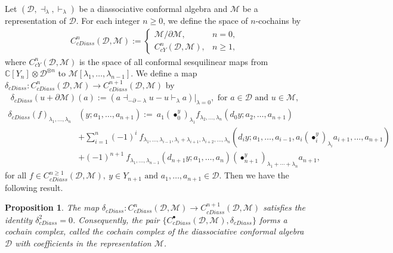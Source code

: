 \documentclass[a4paper,reqno,10pt]{amsart}
\theoremstyle{plain}
\newtheorem{proposition}[thm]{Proposition}
\theoremstyle{definition}
\theoremstyle{remark}
\newcommand{\C}{\mathbb{C}}
\newcommand{\D}{\mathcal{D}}
\newcommand{\M}{\mathcal{M}}
\newcommand{\p}{\partial}
\newcommand{\la}{\lambda}
\begin{document}
\medskip

Let $(\D, \dashv_{\la}, \vdash_{\la})$ be a diassociative conformal algebra and $\M$ be a representation of $\D$. For each integer $n \geq 0$, we define the space of $n$-cochains by
\begin{align*}
    C_{cDiass}^{n}(\D,\M) := 
    \begin{cases}
       \M/{\p \M},   &  n =0,\\
        C_{cY}^{n}(\D,\M),  & n \geq 1,
    \end{cases}
\end{align*}
where $C_{cY}^{n}(\D,\M)$ is the space of all conformal sesquilinear maps from $\mathbb{C}[Y_n]\otimes \D^{\otimes n}$ to $\M[\la_{1}, \dots ,\la_{n-1}]$. 
We define a map $\delta_{cDiass} : C_{cDiass}^{n}(\D,\M) \to  C_{cDiass}^{n+1}(\D,\M)$ by
\begin{align}\label{coboundary-m1}
    \delta_{cDiass}(u+\p\M)(a) := \left(a\dashv_{-\p-\la}u-u\vdash_{\la}a\right) \big|_{\la=0}, \text{ for } a \in \D \text{ and } u \in \M,
\end{align}
\begin{align}\label{coboundary-m2}
   {\delta_{cDiass}(f)}_{\la_1, \ldots, \la_n}&(y;a_1, \ldots , a_{n+1}) :=~  
a_{1} (\bullet_{0}^{y})_{ \la_{1}}f_{ \la_{2}, \ldots, \la_{n}}(d_{0}y; a_{2}, \ldots , a_{n+1}) \nonumber \\&+ \sum_{i =1}^{n}(-1)^{i} ~ \! f_{ \la_{1}, \ldots , \la_{i-1}, \la_{i}+ \la_{i+1}, \la_{i+2}, \ldots , \la_{n}}(d_{i}y; a_{1}, \ldots, a_{i-1},a_{i}(\bullet_{i}^{y})_{\la_{i}} a_{i+1}, \ldots, a_{n+1}) \nonumber \\&
+(-1)^{n+1} ~ \! f_{\la_{1}, \ldots, \la_{n-1}}(d_{n+1}y; a_{1}, \ldots, a_{n})(\bullet_{n+1}^{y})_{\la_{1}+ \cdots+ \la_{n} }a_{n+1},
\end{align}
for all $f \in C_{cDiass}^{n \geq 1}(\D,\M), ~ y \in Y_{n+1} \text{ and } a_1, \ldots , a_{n+1} \in \D$. Then we have the following result.
\begin{proposition}
   The map $\delta_{cDiass} : C_{cDiass}^{n}(\D,\M) \to  C_{cDiass}^{n+1}(\D,\M)$ satisfies the identity $\delta_{cDiass}^{2} = 0$. Consequently, the pair $\{C_{cDiass}^{\bullet}(\D,\M), \delta_{cDiass}\}$ forms a cochain complex, called the cochain complex of the diassociative conformal algebra $\D$ with coefficients in the representation $\M$.
\end{proposition}
\end{document}

